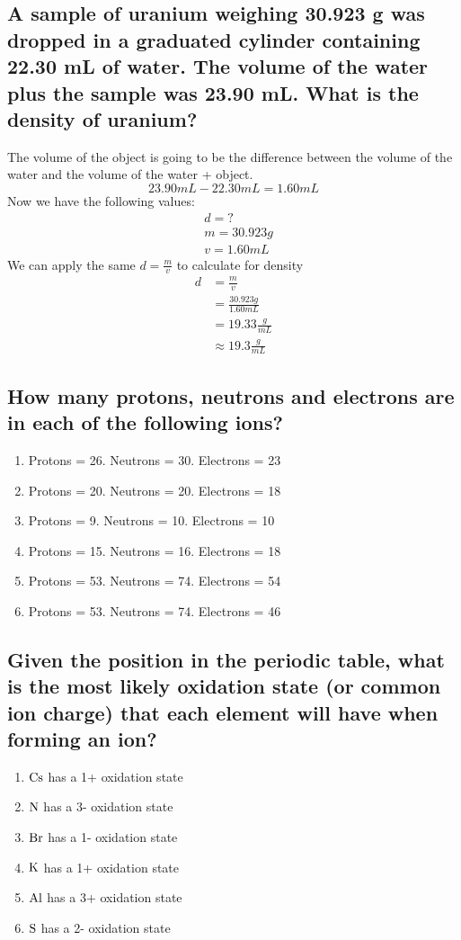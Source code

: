 \documentclass[11pt]{article}
\begin{document}
\subsection{A sample of uranium weighing 30.923 g was dropped in a graduated cylinder containing 22.30 mL of water. The volume of the water plus the sample was 23.90 mL. What is the density of uranium?}
\label{sec:org4e678c1}
The volume of the object is going to be the difference between the volume of the water and the volume of the water + object.
\begin{equation}
23.90mL - 22.30mL = 1.60mL
\end{equation}
Now we have the following values:
\begin{align*}
&d = ?\\
&m = 30.923g\\
&v = 1.60mL
\end{align*}
We can apply the same \(d=\frac{m}{v}\) to calculate for density
\begin{align*}
d&=\frac{m}{v} \\
            &=\frac{30.923g}{1.60mL}\\
            &=19.33\frac{g}{mL}\\
            &\approx19.3\frac{g}{mL}
\end{align*}

\subsection{How many protons, neutrons and electrons are in each of the following ions?}
\label{sec:orgeaf2006}
\begin{enumerate}
\item Protons = 26. Neutrons = 30. Electrons = 23
\item Protons = 20. Neutrons = 20. Electrons = 18
\item Protons = 9. Neutrons = 10. Electrons = 10
\item Protons = 15. Neutrons = 16. Electrons = 18
\item Protons = 53. Neutrons = 74. Electrons = 54
\item Protons = 53. Neutrons = 74. Electrons = 46
\end{enumerate}

\subsection{Given the position in the periodic table, what is the most likely oxidation state (or common ion charge) that each element will have when forming an ion?}
\label{sec:orgb86a179}
\begin{enumerate}
\item \(\ce{Cs}\) has a 1+ oxidation state
\item \(\ce{N}\) has a 3- oxidation state
\item \(\ce{Br}\) has a 1- oxidation state
\item \(\ce{K}\) has a 1+ oxidation state
\item \(\ce{Al}\) has a 3+ oxidation state
\item \(\ce{S}\) has a 2- oxidation state
\end{enumerate}
\end{document}
